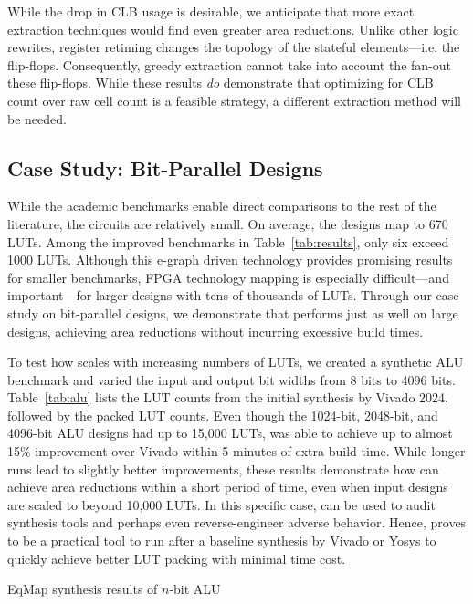 While the drop in CLB usage is desirable, we anticipate that more exact
extraction techniques would find even greater area reductions. Unlike other
logic rewrites, register retiming changes the topology of the stateful
elements---i.e. the flip-flops. Consequently, greedy extraction cannot take
into account the fan-out these flip-flops. While these results \textit{do}
demonstrate that optimizing for CLB count over raw cell count is a feasible
strategy, a different extraction method will be needed.

\subsection{Case Study: Bit-Parallel Designs}\label{sec:results:scalability}

While the academic benchmarks enable direct comparisons to the rest of the
literature, the circuits are relatively small. On average, the designs map to
670 LUTs. Among the \nimproved{} improved benchmarks in
Table~\ref{tab:results}, only six exceed 1000 LUTs. Although this e-graph
driven technology provides promising results for smaller benchmarks, FPGA
technology mapping is especially difficult---and important---for larger designs
with tens of thousands of LUTs. Through our case study on bit-parallel designs,
we demonstrate that \shortname{} performs just as well on large designs,
achieving area reductions without incurring excessive build times.

To test how \shortname{} scales with increasing numbers of LUTs, we created a
synthetic ALU benchmark and varied the input and output bit widths from 8 bits
to 4096 bits. Table~\ref{tab:alu} lists the LUT counts from the initial
synthesis by Vivado 2024, followed by the packed LUT counts. Even though the
1024-bit, 2048-bit, and 4096-bit ALU designs had up to 15,000 LUTs,
\shortname{} was able to achieve up to almost 15\% improvement over Vivado
within 5 minutes of extra build time. While longer runs lead to slightly better
improvements, these results demonstrate how \shortname{} can achieve area
reductions within a short period of time, even when input designs are scaled to
beyond 10,000 LUTs. In this specific case, \shortname{} can be used to audit
synthesis tools and perhaps even reverse-engineer adverse behavior. Hence,
\shortname{} proves to be a practical tool to run after a baseline synthesis by
Vivado or Yosys to quickly achieve better LUT packing with minimal time cost.

\begin{table}
    \centering
    \caption{EqMap synthesis results of $n$-bit ALU}\label{tab:alu}
\end{table}